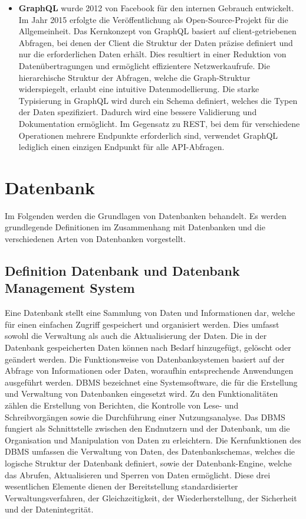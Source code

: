 \begin{itemize}
	\item \textbf{GraphQL} wurde 2012 von Facebook für den internen Gebrauch entwickelt. Im Jahr 2015 erfolgte die Veröffentlichung als Open-Source-Projekt für die Allgemeinheit. Das Kernkonzept von GraphQL basiert auf client-getriebenen Abfragen, bei denen der Client die Struktur der Daten präzise definiert und nur die erforderlichen Daten erhält. Dies resultiert in einer Reduktion von Datenübertragungen und ermöglicht effizientere Netzwerkaufrufe. Die hierarchische Struktur der Abfragen, welche die Graph-Struktur widerspiegelt, erlaubt eine intuitive Datenmodellierung. Die starke Typisierung in GraphQL wird durch ein Schema definiert, welches die Typen der Daten spezifiziert. Dadurch wird eine bessere Validierung und Dokumentation ermöglicht. Im Gegensatz zu REST, bei dem für verschiedene Operationen mehrere Endpunkte erforderlich sind, verwendet GraphQL lediglich einen einzigen Endpunkt für alle API-Abfragen.  \citep{graphqlreplacerest}

\end{itemize}


\section{Datenbank} %
\label{sec:datenbankGrundlagen}
Im Folgenden werden die Grundlagen von Datenbanken behandelt. Es werden grundlegende Definitionen im Zusammenhang mit Datenbanken und die verschiedenen Arten von Datenbanken vorgestellt.
\subsection{Definition Datenbank und Datenbank Management System} %
\label{sec:definitiondatenbank}
Eine Datenbank stellt eine Sammlung von Daten und Informationen dar, welche für einen einfachen Zugriff gespeichert und organisiert werden. Dies umfasst sowohl die Verwaltung als auch die Aktualisierung der Daten. Die in der Datenbank gespeicherten Daten können nach Bedarf hinzugefügt, gelöscht oder geändert werden. Die Funktionsweise von Datenbanksystemen basiert auf der Abfrage von Informationen oder Daten, woraufhin entsprechende Anwendungen ausgeführt werden. DBMS bezeichnet eine Systemsoftware, die für die Erstellung und Verwaltung von Datenbanken eingesetzt wird. Zu den Funktionalitäten zählen die Erstellung von Berichten, die Kontrolle von Lese- und Schreibvorgängen sowie die Durchführung einer Nutzungsanalyse. Das DBMS fungiert als Schnittstelle zwischen den Endnutzern und der Datenbank, um die Organisation und Manipulation von Daten zu erleichtern. Die Kernfunktionen des DBMS umfassen die Verwaltung von Daten, des Datenbankschemas, welches die logische Struktur der Datenbank definiert, sowie der Datenbank-Engine, welche das Abrufen, Aktualisieren und Sperren von Daten ermöglicht. Diese drei wesentlichen Elemente dienen der Bereitstellung standardisierter Verwaltungsverfahren, der Gleichzeitigkeit, der Wiederherstellung, der Sicherheit und der Datenintegrität. \citep{9677042}

